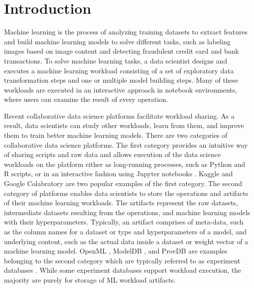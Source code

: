 \section{Introduction} \label{sec-introduction}
Machine learning is the process of analyzing training datasets to extract features and build machine learning models to solve different tasks, such as labeling images based on image content and detecting fraudulent credit card and bank transactions.
To solve machine learning tasks, a data scientist designs and executes a machine learning workload consisting of a set of exploratory data transformation steps and one or multiple model building steps.
Many of these workloads are executed in an interactive approach in notebook environments, where users can examine the result of every operation.

Recent collaborative data science platforms facilitate workload sharing.
As a result, data scientists can study other workloads, learn from them, and improve them to train better machine learning models.
There are two categories of collaborative data science platforms.
The first category provides an intuitive way of sharing scripts and raw data and allows execution of the data science workloads on the platform either as long-running processes, such as Python and R scripts, or in an interactive fashion using Jupyter notebooks \cite{Kluyver:2016aa}.
Kaggle \cite{kagglewebsite} and Google Colabratory \cite{googlecolab} are two popular examples of the first category.
The second category of platforms enables data scientists to store the operations and artifacts of their machine learning workloads.
The artifacts represent the raw datasets, intermediate datasets resulting from the operations, and machine learning models with their hyperparameters.
Typically, an artifact comprises of meta-data, such as the column names for a dataset or type and hyperparameters of a model,  and underlying content, such as the actual data inside a dataset or weight vector of a machine learning model.
OpenML \cite{vanschoren2014openml}, ModelDB \cite{vartak2016m}, and ProvDB \cite{miao2018provdb} are examples belonging to the second category which are typically referred to as experiment databases \cite{Vanschoren2012}.
While some experiment databases support workload execution, the majority are purely for storage of ML workload artifacts.

